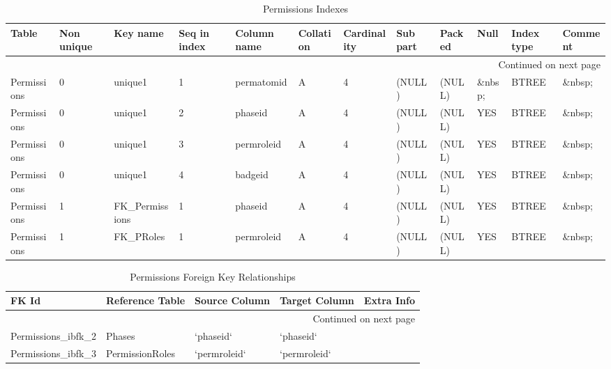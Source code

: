 \documentclass[tablesignature]{scrartcl}
\begin{document}
\begin{longtable}{|l|l|l|l|l|l|l|l|l|l|l|l|}
\caption{Permissions Indexes} \label{tbl:permissionsindexes}\\
\hline
 Table        &  Non unique  &  Key name           &  Seq in index  &  Column name   &  Collation  &  Cardinality  &  Sub part  &  Packed  &  Null     &  Index type  &  Comment \\
\hline
\endhead
\hline\multicolumn{12}{r}{Continued on next page}\
\endfoot
\endlastfoot
\hline
 Permissions  &           0  &  PRIMARY            &             1  &  permissionid  &  A          &            4  &  (NULL)    &  (NULL)  &  \&nbsp;  &  BTREE       &  \&nbsp;  \\
 Permissions  &           0  &  unique1            &             1  &  permatomid    &  A          &            4  &  (NULL)    &  (NULL)  &  \&nbsp;  &  BTREE       &  \&nbsp;  \\
 Permissions  &           0  &  unique1            &             2  &  phaseid       &  A          &            4  &  (NULL)    &  (NULL)  &  YES      &  BTREE       &  \&nbsp;  \\
 Permissions  &           0  &  unique1            &             3  &  permroleid    &  A          &            4  &  (NULL)    &  (NULL)  &  YES      &  BTREE       &  \&nbsp;  \\
 Permissions  &           0  &  unique1            &             4  &  badgeid       &  A          &            4  &  (NULL)    &  (NULL)  &  YES      &  BTREE       &  \&nbsp;  \\
 Permissions  &           1  &  FK\_{}Permissions  &             1  &  phaseid       &  A          &            4  &  (NULL)    &  (NULL)  &  YES      &  BTREE       &  \&nbsp;  \\
 Permissions  &           1  &  FK\_{}PRoles       &             1  &  permroleid    &  A          &            4  &  (NULL)    &  (NULL)  &  YES      &  BTREE       &  \&nbsp;  \\
\hline
\end{longtable}


\begin{longtable}{|l|l|l|l|l|}
\caption{Permissions Foreign Key Relationships} \label{tbl:permissionsfkr}\\
\hline
 FK Id                     &  Reference Table  &  Source Column  &  Target Column  &  Extra Info \\
\hline
\endhead
\hline\multicolumn{5}{r}{Continued on next page}\
\endfoot
\endlastfoot
\hline
 Permissions\_{}ibfk\_{}1  &  PermissionAtoms  &  `permatomid`   &  `permatomid`   &              \\
 Permissions\_{}ibfk\_{}2  &  Phases           &  `phaseid`      &  `phaseid`      &              \\
 Permissions\_{}ibfk\_{}3  &  PermissionRoles  &  `permroleid`   &  `permroleid`   &              \\
\hline
\end{longtable}
\end{document}
